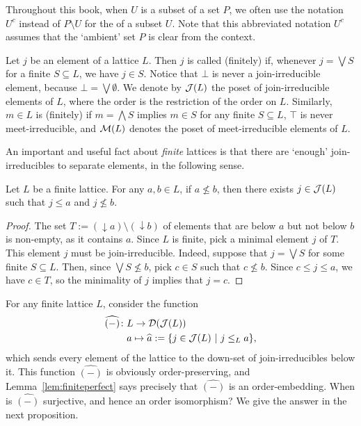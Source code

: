 \begin{notation}
  Throughout this book, when $U$ is a subset of a set $P$, we often use the notation $U^c$ instead of $P \setminus U$ for the  of a subset $U$. Note that this abbreviated notation $U^c$ assumes that the `ambient' set $P$ is clear from the context.
\end{notation}

Let $j$ be an element of a lattice $L$. Then $j$ is called (finitely)  if, whenever $j = \bigvee S$ for a finite $S \subseteq L$, we have $j \in S$. Notice that $\bot$ is never a join-irreducible element, because $\bot = \bigvee \emptyset$.
We denote by $\mathcal{J}(L)$ the poset of join-irreducible elements of $L$, where the order is the restriction of the order on $L$.
Similarly, $m \in L$ is (finitely)  if $m = \bigwedge S$ implies $m \in S$ for any finite $S \subseteq L$, $\top$ is never meet-irreducible, and $\mathcal{M}(L)$ denotes the poset of meet-irreducible elements of $L$.

An important and useful fact about \emph{finite} lattices is that there are `enough' join-irreducibles to separate elements, in the following sense.
\begin{lemma}\label{lem:finiteperfect}
Let $L$ be a finite lattice. For any $a, b \in L$, if $a \nleq b$, then there exists $j \in \mathcal{J}(L)$ such that $j \leq a$ and $j \nleq b$.
\end{lemma}
\begin{proof}
The set $T := ({\downarrow} a) \setminus ({\downarrow} b)$ of elements that are below $a$ but not below $b$ is non-empty, as it contains $a$. Since $L$ is finite, pick a minimal element $j$ of $T$. This element $j$ must be join-irreducible. Indeed, suppose that $j = \bigvee S$ for some finite $S \subseteq L$. Then, since $\bigvee S \nleq b$, pick $c \in S$ such that $c \nleq b$. Since $c \leq j \leq a$, we have $c \in T$, so the minimality of $j$ implies that $j = c$.
\end{proof}

For any finite lattice $L$, consider the function
\begin{align*}
\widehat{(-)} \colon &L \to \mathcal{D}(\mathcal{J}(L)) \\
			&a \mapsto \widehat{a} := \{j \in \mathcal{J}(L) \ | \ j \leq_L a\},
\end{align*}
which sends every element of the lattice to the down-set of join-irreducibles below it. This function $\widehat{(-)}$ is obviously order-preserving, and Lemma~\ref{lem:finiteperfect} says precisely that $\widehat{(-)}$ is an order-embedding. When is $\widehat{(-)}$ surjective, and hence an order isomorphism? We give the answer in the next proposition.

